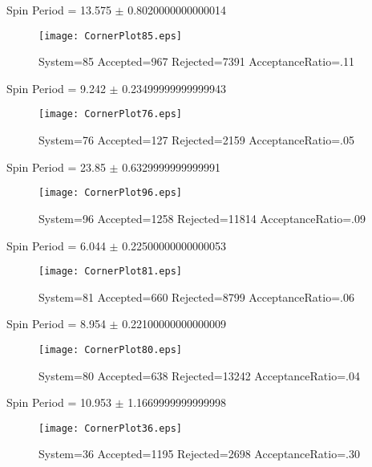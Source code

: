 \documentclass[10pt]{article}
\begin{document}
\listoffigures
\newpage
\begin{center}
        Spin Period = 13.575 $\pm$ 0.8020000000000014
        \end{center}
\begin{figure}[h] 
        \texttt{[image: CornerPlot85.eps]}
        \caption{System=85 Accepted=967 Rejected=7391 AcceptanceRatio=.11}
        \label{S85}
        \centering
        \end{figure}
\newpage
\begin{center}
        Spin Period = 9.242 $\pm$ 0.23499999999999943
        \end{center}
\begin{figure}[h] 
        \texttt{[image: CornerPlot76.eps]}
        \caption{System=76 Accepted=127 Rejected=2159 AcceptanceRatio=.05}
        \label{S76}
        \centering
        \end{figure}
\newpage
\begin{center}
        Spin Period = 23.85 $\pm$ 0.6329999999999991
        \end{center}
\begin{figure}[h] 
        \texttt{[image: CornerPlot96.eps]}
        \caption{System=96 Accepted=1258 Rejected=11814 AcceptanceRatio=.09}
        \label{S96}
        \centering
        \end{figure}
\newpage
\begin{center}
        Spin Period = 6.044 $\pm$ 0.22500000000000053
        \end{center}
\begin{figure}[h] 
        \texttt{[image: CornerPlot81.eps]}
        \caption{System=81 Accepted=660 Rejected=8799 AcceptanceRatio=.06}
        \label{S81}
        \centering
        \end{figure}
\newpage
\begin{center}
        Spin Period = 8.954 $\pm$ 0.22100000000000009
        \end{center}
\begin{figure}[h] 
        \texttt{[image: CornerPlot80.eps]}
        \caption{System=80 Accepted=638 Rejected=13242 AcceptanceRatio=.04}
        \label{S80}
        \centering
        \end{figure}
\newpage
\begin{center}
        Spin Period = 10.953 $\pm$ 1.1669999999999998
        \end{center}
\begin{figure}[h] 
        \texttt{[image: CornerPlot36.eps]}
        \caption{System=36 Accepted=1195 Rejected=2698 AcceptanceRatio=.30}
        \label{S36}
        \centering
        \end{figure}
\end{document}
